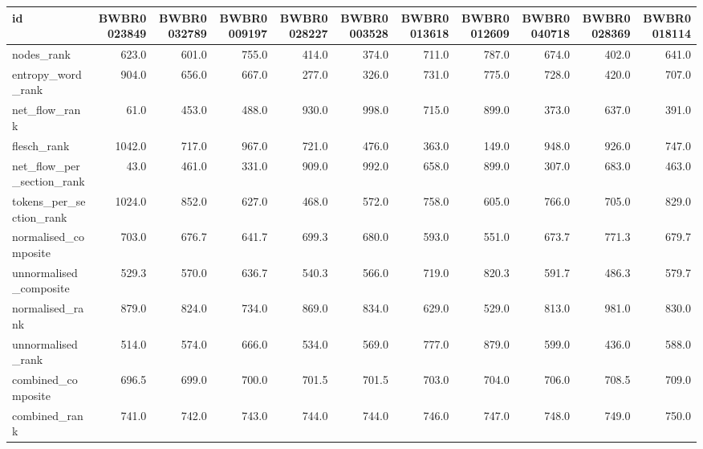 \begin{tabular}{lrrrrrrrrrr}
\toprule
id & BWBR0023849 & BWBR0032789 & BWBR0009197 & BWBR0028227 & BWBR0003528 & BWBR0013618 & BWBR0012609 & BWBR0040718 & BWBR0028369 & BWBR0018114 \\
\midrule
nodes\_rank & 623.0 & 601.0 & 755.0 & 414.0 & 374.0 & 711.0 & 787.0 & 674.0 & 402.0 & 641.0 \\
\cline{1-11}
entropy\_word\_rank & 904.0 & 656.0 & 667.0 & 277.0 & 326.0 & 731.0 & 775.0 & 728.0 & 420.0 & 707.0 \\
\cline{1-11}
net\_flow\_rank & 61.0 & 453.0 & 488.0 & 930.0 & 998.0 & 715.0 & 899.0 & 373.0 & 637.0 & 391.0 \\
\cline{1-11}
flesch\_rank & 1042.0 & 717.0 & 967.0 & 721.0 & 476.0 & 363.0 & 149.0 & 948.0 & 926.0 & 747.0 \\
\cline{1-11}
net\_flow\_per\_section\_rank & 43.0 & 461.0 & 331.0 & 909.0 & 992.0 & 658.0 & 899.0 & 307.0 & 683.0 & 463.0 \\
\cline{1-11}
tokens\_per\_section\_rank & 1024.0 & 852.0 & 627.0 & 468.0 & 572.0 & 758.0 & 605.0 & 766.0 & 705.0 & 829.0 \\
\cline{1-11}
normalised\_composite & 703.0 & 676.7 & 641.7 & 699.3 & 680.0 & 593.0 & 551.0 & 673.7 & 771.3 & 679.7 \\
\cline{1-11}
unnormalised\_composite & 529.3 & 570.0 & 636.7 & 540.3 & 566.0 & 719.0 & 820.3 & 591.7 & 486.3 & 579.7 \\
\cline{1-11}
normalised\_rank & 879.0 & 824.0 & 734.0 & 869.0 & 834.0 & 629.0 & 529.0 & 813.0 & 981.0 & 830.0 \\
\cline{1-11}
unnormalised\_rank & 514.0 & 574.0 & 666.0 & 534.0 & 569.0 & 777.0 & 879.0 & 599.0 & 436.0 & 588.0 \\
\cline{1-11}
combined\_composite & 696.5 & 699.0 & 700.0 & 701.5 & 701.5 & 703.0 & 704.0 & 706.0 & 708.5 & 709.0 \\
\cline{1-11}
combined\_rank & 741.0 & 742.0 & 743.0 & 744.0 & 744.0 & 746.0 & 747.0 & 748.0 & 749.0 & 750.0 \\
\cline{1-11}
\bottomrule
\end{tabular}
